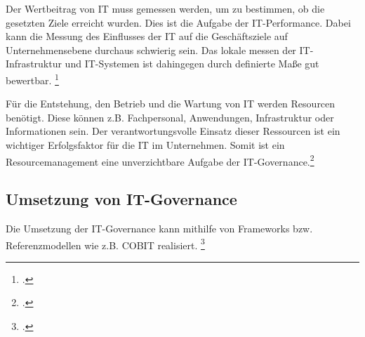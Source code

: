 Der Wertbeitrag von IT muss gemessen werden, um zu bestimmen, ob die gesetzten Ziele erreicht wurden. Dies ist die Aufgabe der IT-Performance. Dabei kann die Messung des Einflusses der IT auf die Geschäftsziele auf Unternehmensebene durchaus schwierig sein. Das lokale messen der IT-Infrastruktur und IT-Systemen ist dahingegen durch definierte Maße gut bewertbar. \footcite[Vgl.][361]{hofmann_it-governance_2010}

Für die Entstehung, den Betrieb und die Wartung von IT werden Resourcen benötigt. Diese können z.B. Fachpersonal, Anwendungen, Infrastruktur oder Informationen sein. Der verantwortungsvolle Einsatz dieser Ressourcen ist ein wichtiger Erfolgsfaktor für die IT im Unternehmen. Somit ist ein Resourcemanagement eine unverzichtbare Aufgabe der IT-Governance.\footcite[Vgl.][362]{hofmann_it-governance_2010}


 
\subsection{Umsetzung von IT-Governance}

Die Umsetzung der IT-Governance kann mithilfe von Frameworks bzw. Referenzmodellen wie z.B. COBIT realisiert. \footcite[Vgl.][7]{johannsen_it-governance_2006}